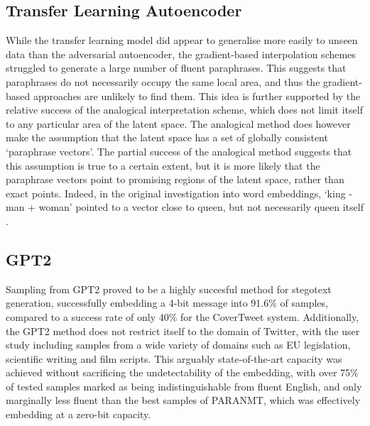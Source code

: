 \documentclass[12pt,a4paper]{article}
\begin{document}


\subsection{Transfer Learning Autoencoder}

\noindent While the transfer learning model did appear to generalise more easily to unseen data than the adversarial autoencoder, the gradient-based interpolation schemes struggled to generate a large number of fluent paraphrases. This suggests that paraphrases do not necessarily occupy the same local area, and thus the gradient-based approaches are unlikely to find them. This idea is further supported by the relative success of the analogical interpretation scheme, which does not limit itself to any particular area of the latent space. The analogical method does however make the assumption that the latent space has a set of globally consistent `paraphrase vectors'. The partial success of the analogical method suggests that this assumption is true to a certain extent, but it is more likely that the paraphrase vectors point to promising regions of the latent space, rather than exact points. Indeed, in the original investigation into word embeddings, `king - man + woman' pointed to a vector close to queen, but not necessarily queen itself \cite{word2vec}. 


% 

\subsection{GPT2}

\noindent Sampling from GPT2 proved to be a highly succesful method for stegotext generation, successfully embedding a 4-bit message into 91.6\% of samples, compared to a success rate of only 40\% for the CoverTweet system. Additionally, the GPT2 method does not restrict itself to the domain of Twitter, with the user study including samples from a wide variety of domains such as EU legislation, scientific writing and film scripts. This arguably state-of-the-art capacity was achieved without sacrificing the undetectability of the embedding, with over 75\% of tested samples marked as being indistinguishable from fluent English, and only marginally less fluent than the best samples of P{\footnotesize ARA}NMT, which was effectively embedding at a zero-bit capacity.
\end{document}
